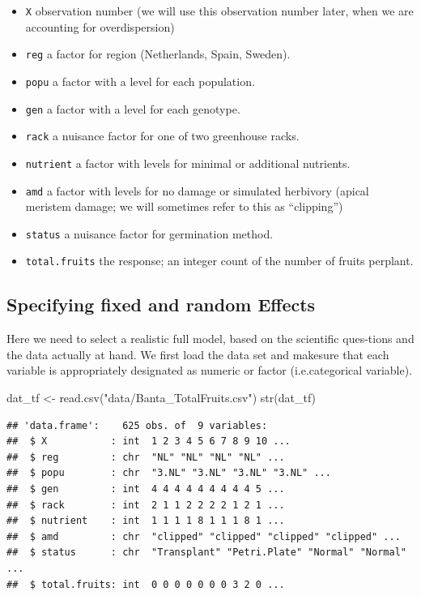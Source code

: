 \documentclass[
  12pt,
]{book}
\newenvironment{Shaded}{\begin{snugshade}}{\end{snugshade}}
\newcommand{\FunctionTok}[1]{\textcolor[rgb]{0.00,0.00,0.00}{#1}}
\newcommand{\NormalTok}[1]{#1}
\newcommand{\OtherTok}[1]{\textcolor[rgb]{0.56,0.35,0.01}{#1}}
\newcommand{\StringTok}[1]{\textcolor[rgb]{0.31,0.60,0.02}{#1}}
\providecommand{\tightlist}{%
  \setlength{\itemsep}{0pt}\setlength{\parskip}{0pt}}
\begin{document}
\begin{itemize}
\tightlist
\item
  \texttt{X} observation number (we will use this observation number later, when we are accounting for overdispersion)
\item
  \texttt{reg} a factor for region (Netherlands, Spain, Sweden).
\item
  \texttt{popu} a factor with a level for each population.
\item
  \texttt{gen} a factor with a level for each genotype.
\item
  \texttt{rack} a nuisance factor for one of two greenhouse racks.
\item
  \texttt{nutrient} a factor with levels for minimal or additional nutrients.
\item
  \texttt{amd} a factor with levels for no damage or simulated herbivory (apical meristem damage; we will sometimes refer to this as ``clipping'')
\item
  \texttt{status} a nuisance factor for germination method.
\item
  \texttt{total.fruits} the response; an integer count of the number of fruits perplant.
\end{itemize}

\hypertarget{specifying-fixed-and-random-effects}{%
\subsection{Specifying fixed and random Effects}\label{specifying-fixed-and-random-effects}}

Here we need to select a realistic full model, based on the scientific ques-tions and the data actually at hand. We first load the data set and makesure that each variable is appropriately designated as numeric or factor (i.e.categorical variable).

\begin{Shaded}
\begin{Highlighting}[]
\NormalTok{dat\_tf }\OtherTok{\textless{}{-}} \FunctionTok{read.csv}\NormalTok{(}\StringTok{"data/Banta\_TotalFruits.csv"}\NormalTok{)}
\FunctionTok{str}\NormalTok{(dat\_tf)}
\end{Highlighting}
\end{Shaded}

\begin{verbatim}
## 'data.frame':    625 obs. of  9 variables:
##  $ X           : int  1 2 3 4 5 6 7 8 9 10 ...
##  $ reg         : chr  "NL" "NL" "NL" "NL" ...
##  $ popu        : chr  "3.NL" "3.NL" "3.NL" "3.NL" ...
##  $ gen         : int  4 4 4 4 4 4 4 4 4 5 ...
##  $ rack        : int  2 1 1 2 2 2 2 1 2 1 ...
##  $ nutrient    : int  1 1 1 1 8 1 1 1 8 1 ...
##  $ amd         : chr  "clipped" "clipped" "clipped" "clipped" ...
##  $ status      : chr  "Transplant" "Petri.Plate" "Normal" "Normal" ...
##  $ total.fruits: int  0 0 0 0 0 0 0 3 2 0 ...
\end{verbatim}
\end{document}
